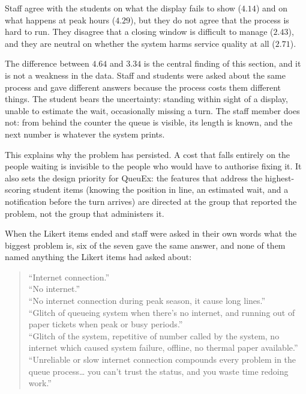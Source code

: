 \documentclass{research}
\newcommand{\sysname}{QueuEx}
\begin{document}
Staff agree with the students on what the display fails to
show ($4.14$) and on what happens at peak hours ($4.29$), but they do
not agree that the process is hard to run. They disagree that a closing
window is difficult to manage ($2.43$), and they are neutral on whether
the system harms service quality at all ($2.71$).

\label{subsec:sop1-gap}

The difference between $4.64$ and $3.34$ is the central finding of this
section, and it is not a weakness in the data. Staff and students were
asked about the same process and gave different answers because the
process costs them different things. The student bears the uncertainty:
standing within sight of a display, unable to estimate the wait,
occasionally missing a turn. The staff member does not: from behind
the counter the queue is visible, its length is known, and the next
number is whatever the system prints.

This explains why the problem has persisted. A cost that falls entirely
on the people waiting is invisible to the people who would have to
authorise fixing it. It also sets the design priority for
\sysname{}: the features that address the highest-scoring student items
(knowing the position in line, an estimated wait, and a notification
before the turn arrives) are directed at the group that reported the
problem, not the group that administers it.

\label{subsec:sop1-connectivity}

When the Likert items ended and staff were asked in their own words
what the biggest problem is, six of the seven gave the same answer, and
none of them named anything the Likert items had asked about:

\begin{quote}
``Internet connection.''\\
``No internet.''\\
``No internet connection during peak season, it cause long lines.''\\
``Glitch of queueing system when there's no internet, and running out
of paper tickets when peak or busy periods.''\\
``Glitch of the system, repetitive of number called by the system, no
internet which caused system failure, offline, no thermal paper
available.''\\
``Unreliable or slow internet connection compounds every problem in the
queue process\ldots{} you can't trust the status, and you waste time
redoing work.''
\end{quote}
\end{document}
